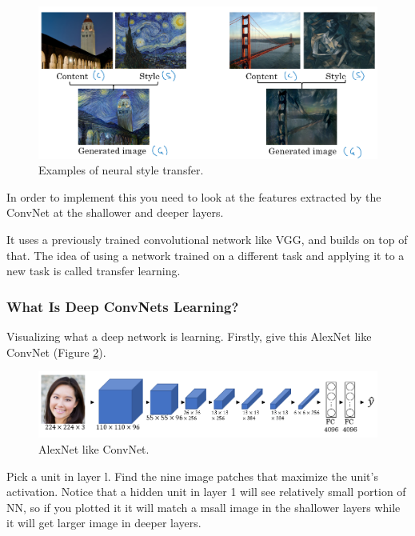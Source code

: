 \begin{figure}[!htbp]
    \centering
    \includegraphics[width=1.0\textwidth]{img/c4/style-transfer.png}
    \caption{Examples of neural style transfer.}
    \label{style-transfer}  
\end{figure}

In order to implement this you need to look at the features extracted by the ConvNet at the shallower and deeper layers.

It uses a previously trained convolutional network like VGG, and builds on top of that. The idea of using a network trained on a different task and applying it to a new task is called transfer learning.

\subsubsection{What Is Deep ConvNets Learning?}
Visualizing what a deep network is learning. Firstly, give this AlexNet like ConvNet (Figure \ref{visualize-convs}).

\begin{figure}[!htbp]
    \centering
    \includegraphics[width=1.0\textwidth]{img/c4/visualize-convnets.png}
    \caption{AlexNet like ConvNet.}
    \label{visualize-convs}  
\end{figure}

Pick a unit in layer l. Find the nine image patches that maximize the unit's activation. Notice that a hidden unit in layer 1 will see relatively small portion of NN, so if you plotted it it will match a msall image in the shallower layers while it will get larger image in deeper layers.

